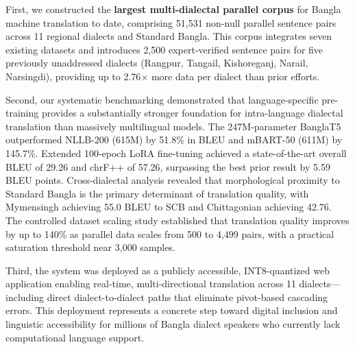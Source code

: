\documentclass[12pt,a4paper]{article}
\begin{document}
First, we constructed the \textbf{largest multi-dialectal parallel corpus} for Bangla machine translation to date, comprising 51,531 non-null parallel sentence pairs across 11 regional dialects and Standard Bangla. This corpus integrates seven existing datasets and introduces 2,500 expert-verified sentence pairs for five previously unaddressed dialects (Rangpur, Tangail, Kishoreganj, Narail, Narsingdi), providing up to 2.76$\times$ more data per dialect than prior efforts.

Second, our systematic benchmarking demonstrated that language-specific pre-training provides a substantially stronger foundation for intra-language dialectal translation than massively multilingual models. The 247M-parameter BanglaT5 outperformed NLLB-200 (615M) by 51.8\% in BLEU and mBART-50 (611M) by 145.7\%. Extended 100-epoch LoRA fine-tuning achieved a state-of-the-art overall BLEU of 29.26 and chrF++ of 57.26, surpassing the best prior result by 5.59 BLEU points. Cross-dialectal analysis revealed that morphological proximity to Standard Bangla is the primary determinant of translation quality, with Mymensingh achieving 55.0 BLEU to SCB and Chittagonian achieving 42.76. The controlled dataset scaling study established that translation quality improves by up to 140\% as parallel data scales from 500 to 4,499 pairs, with a practical saturation threshold near 3,000 samples.

Third, the system was deployed as a publicly accessible, INT8-quantized web application enabling real-time, multi-directional translation across 11 dialects---including direct dialect-to-dialect paths that eliminate pivot-based cascading errors. This deployment represents a concrete step toward digital inclusion and linguistic accessibility for millions of Bangla dialect speakers who currently lack computational language support.



\end{document}
